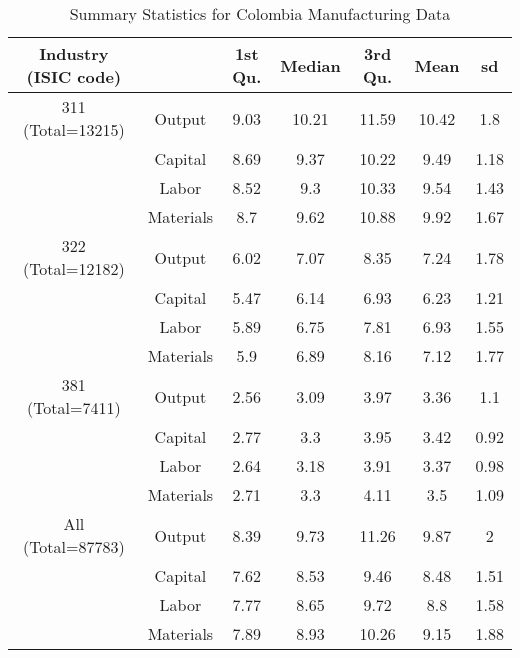 \begin{table}[H]
\centering
\caption{Summary Statistics for Colombia Manufacturing Data} 
\begin{tabular}{ccccccc}
  \hline\hline Industry (ISIC code) &   & 1st Qu. & Median & 3rd Qu. & Mean & sd \\ 
  \hline
311 (Total=13215) & Output & 9.03 & 10.21 & 11.59 & 10.42 & 1.8 \\ 
   & Capital & 8.69 & 9.37 & 10.22 & 9.49 & 1.18 \\ 
   & Labor & 8.52 & 9.3 & 10.33 & 9.54 & 1.43 \\ 
   & Materials & 8.7 & 9.62 & 10.88 & 9.92 & 1.67 \\ 
  322 (Total=12182) & Output & 6.02 & 7.07 & 8.35 & 7.24 & 1.78 \\ 
   & Capital & 5.47 & 6.14 & 6.93 & 6.23 & 1.21 \\ 
   & Labor & 5.89 & 6.75 & 7.81 & 6.93 & 1.55 \\ 
   & Materials & 5.9 & 6.89 & 8.16 & 7.12 & 1.77 \\ 
  381 (Total=7411) & Output & 2.56 & 3.09 & 3.97 & 3.36 & 1.1 \\ 
   & Capital & 2.77 & 3.3 & 3.95 & 3.42 & 0.92 \\ 
   & Labor & 2.64 & 3.18 & 3.91 & 3.37 & 0.98 \\ 
   & Materials & 2.71 & 3.3 & 4.11 & 3.5 & 1.09 \\ 
  All (Total=87783) & Output & 8.39 & 9.73 & 11.26 & 9.87 & 2 \\ 
   & Capital & 7.62 & 8.53 & 9.46 & 8.48 & 1.51 \\ 
   & Labor & 7.77 & 8.65 & 9.72 & 8.8 & 1.58 \\ 
   & Materials & 7.89 & 8.93 & 10.26 & 9.15 & 1.88 \\ 
   \hline
\end{tabular}
\end{table}
